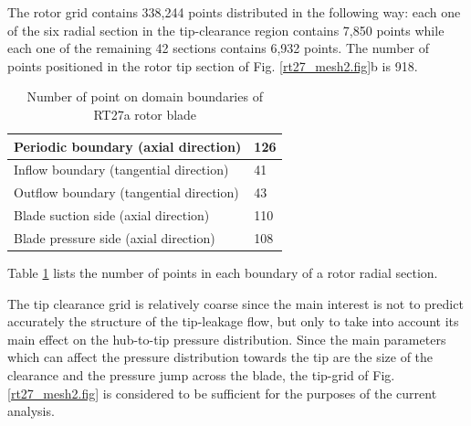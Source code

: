 %
 The rotor grid contains 338,244 points distributed in the following way:
 each one of the six radial section in the tip-clearance region
 contains 7,850 points while each one of the remaining 42 sections
 contains 6,932 points. The number of points positioned in the
 rotor tip section of Fig. \ref{rt27_mesh2.fig}b is 918.
%
\begin{table}
\vspace{5mm}
\begin{center}
\begin{tabular}{|l|l|}\hline\hline
 Periodic boundary (axial direction) & 126\\ \hline
 Inflow boundary (tangential direction)& 41\\ \hline
 Outflow boundary (tangential direction)& 43\\ \hline
 Blade suction side (axial direction)& 110\\ \hline
 Blade pressure side (axial direction)& 108\\ \hline
\hline
\end{tabular}
\end{center}
\caption{Number of point on domain boundaries of RT27a rotor blade}
\label{rotor_mesh.tab}
\end{table}
%
 Table \ref{rotor_mesh.tab} lists the number of points in each boundary
 of a rotor radial section.

 The tip clearance grid is relatively coarse since the main interest
 is not to predict accurately the structure of the tip-leakage flow,
 but only to take into account its main effect on the
 hub-to-tip pressure distribution.
 Since the main parameters which can affect the pressure distribution
 towards the tip are the size of the clearance and the
 pressure jump across the blade,
 the tip-grid of Fig. \ref{rt27_mesh2.fig}
 is considered to be sufficient for the purposes of the current analysis.
%
%
%
